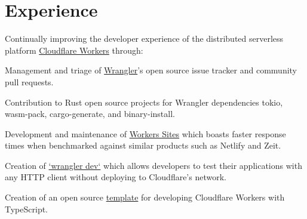 \documentclass[]{deedy-resume-openfont}
\begin{document}
%
%

%
%


\section{Experience}

\vspace{\topsep}
Continually improving the developer experience of the distributed serverless platform  \href{https://workers.cloudflare.com}{Cloudflare Workers} through:
\begin{tightemize}
\item Management and triage of \href{https://github.com/cloudflare/wrangler}{Wrangler}'s open source issue tracker and community pull requests.
\item Contribution to Rust open source projects for Wrangler dependencies tokio, wasm-pack, cargo-generate, and binary-install.
\item Development and maintenance of \href{https://workers.cloudflare.com/sites}{Workers Sites} which boasts faster response times when benchmarked against similar products such as Netlify and Zeit.
\item Creation of \href{https://github.com/cloudflare/wrangler/milestone/18}{`wrangler dev`} which allows developers to test their applications with any HTTP client without deploying to Cloudflare's network.
\item Creation of an open source \href{https://github.com/EverlastingBugstopper/worker-typescript-template}{template} for developing Cloudflare Workers with TypeScript.
\end{tightemize}
\sectionsep
\end{document}
